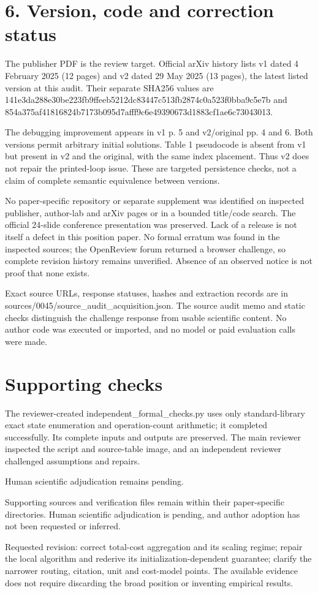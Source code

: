 \documentclass[10pt]{article}
\begin{document}
\section*{6. Version, code and correction status}
The publisher PDF is the review target. Official arXiv history lists v1 dated 4 February 2025 (12 pages) and v2 dated 29 May 2025 (13 pages), the latest listed version at this audit. Their separate SHA256 values are 141e3da288e30be223fb9ffeeb5212dc83447c513fb2874c0a523f0bba9c5e7b and 854a375af41816824b7173b095d7afff9c6e49390673d1883cf1ae6c73043013.\par
The debugging improvement appears in v1 p. 5 and v2/original pp. 4 and 6. Both versions permit arbitrary initial solutions. Table 1 pseudocode is absent from v1 but present in v2 and the original, with the same index placement. Thus v2 does not repair the printed-loop issue. These are targeted persistence checks, not a claim of complete semantic equivalence between versions.\par
No paper-specific repository or separate supplement was identified on inspected publisher, author-lab and arXiv pages or in a bounded title/code search. The official 24-slide conference presentation was preserved. Lack of a release is not itself a defect in this position paper. No formal erratum was found in the inspected sources; the OpenReview forum returned a browser challenge, so complete revision history remains unverified. Absence of an observed notice is not proof that none exists.\par
Exact source URLs, response statuses, hashes and extraction records are in sources/0045/source\_audit\_acquisition.json. The source audit memo and static checks distinguish the challenge response from usable scientific content. No author code was executed or imported, and no model or paid evaluation calls were made.\par
\section*{Supporting checks}
The reviewer-created independent\_formal\_checks.py uses only standard-library exact state enumeration and operation-count arithmetic; it completed successfully. Its complete inputs and outputs are preserved. The main reviewer inspected the script and source-table image, and an independent reviewer challenged assumptions and repairs.\par
Human scientific adjudication remains pending.\par
Supporting sources and verification files remain within their paper-specific directories. Human scientific adjudication is pending, and author adoption has not been requested or inferred.\par
Requested revision: correct total-cost aggregation and its scaling regime; repair the local algorithm and rederive its initialization-dependent guarantee; clarify the narrower routing, citation, unit and cost-model points. The available evidence does not require discarding the broad position or inventing empirical results.\par
\end{document}
